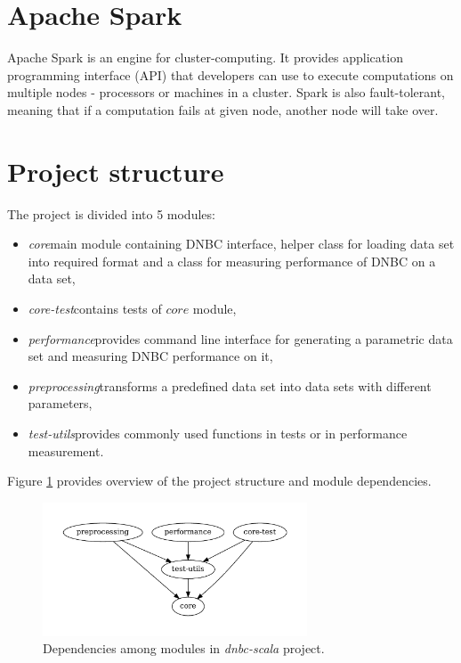 \documentclass[thesis=B,english]{FITthesis}[2012/06/26]
\begin{document}
\section{Apache Spark}

Apache Spark is an engine for cluster-computing. It provides application programming interface (API) that developers can use to execute computations on multiple nodes - processors or machines in a cluster. Spark is also fault-tolerant, meaning that if a computation fails at given node, another node will take over.

\section{Project structure}

The project is divided into 5 modules:

\begin{itemize}

\item \textit{core}\textemdash main module containing DNBC interface, helper class for loading data set into required format and a class for measuring performance of DNBC on a data set,
\item \textit{core-test}\textemdash contains tests of $core$ module,
\item \textit{performance}\textemdash provides command line interface for generating a parametric data set and measuring DNBC performance on it,
\item \textit{preprocessing}\textemdash transforms a predefined data set into data sets with different parameters,
\item \textit{test-utils}\textemdash provides commonly used functions in tests or in performance measurement.

\end{itemize}

Figure \ref{fig:module-dependencies} provides overview of the project structure and module dependencies.

\begin{figure}
	\centering
 	\includegraphics[width=0.7\textwidth]{module-dependencies}
 	\caption{Dependencies among modules in \textit{dnbc-scala} project.}
 	\label{fig:module-dependencies}
\end{figure}
\end{document}
